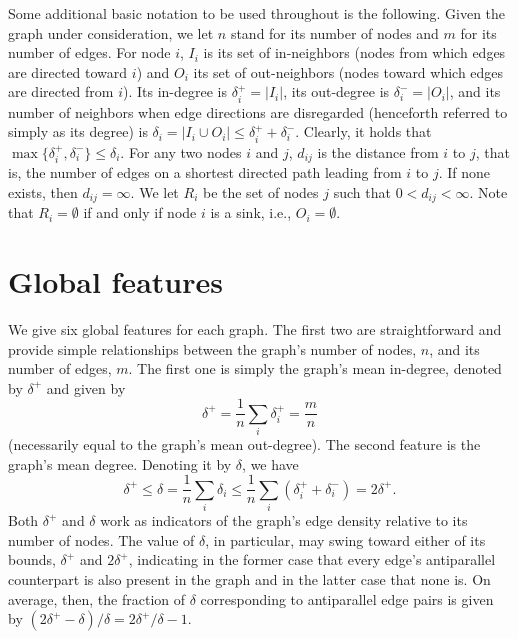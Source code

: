 \documentclass{article}
\begin{document}
Some additional basic notation to be used throughout is the following. Given the
graph under consideration, we let $n$ stand for its number of nodes and $m$ for
its number of edges. For node $i$, $I_i$ is its set of in-neighbors (nodes from
which edges are directed toward $i$) and $O_i$ its set of out-neighbors (nodes
toward which edges are directed from $i$). Its in-degree is
$\delta_i^+=\vert I_i\vert$, its out-degree is $\delta_i^-=\vert O_i\vert$, and
its number of neighbors when edge directions are disregarded (henceforth
referred to simply as its degree) is
$\delta_i=\vert I_i\cup O_i\vert\le\delta_i^++\delta_i^-$. Clearly, it holds
that $\max\{\delta_i^+,\delta_i^-\}\le\delta_i$. For any two nodes $i$ and $j$,
$d_{ij}$ is the distance from $i$ to $j$, that is, the number of edges on a
shortest directed path leading from $i$ to $j$. If none exists, then
$d_{ij}=\infty$. We let $R_i$ be the set of nodes $j$ such that
$0<d_{ij}<\infty$. Note that $R_i=\emptyset$ if and only if node $i$ is a sink,
i.e., $O_i=\emptyset$.

\section{Global features}\label{global}

We give six global features for each graph. The first two are straightforward
and provide simple relationships between the graph's number of nodes, $n$, and
its number of edges, $m$. The first one is simply the graph's mean in-degree,
denoted by $\delta^+$ and given by
\begin{equation}
\delta^+
=\frac{1}{n}\sum_i\delta_i^+
=\frac{m}{n}
\end{equation}
(necessarily equal to the graph's mean out-degree). The second feature is the
graph's mean degree. Denoting it by $\delta$, we have
\begin{equation}
\delta^+
\le\delta
=\frac{1}{n}\sum_i\delta_i
\le\frac{1}{n}\sum_i(\delta_i^++\delta_i^-)
=2\delta^+.
\end{equation}
Both $\delta^+$ and $\delta$ work as indicators of the graph's edge density
relative to its number of nodes. The value of $\delta$, in particular, may swing
toward either of its bounds, $\delta^+$ and $2\delta^+$, indicating in the
former case that every edge's antiparallel counterpart is also present in the
graph and in the latter case that none is. On average, then, the fraction of
$\delta$ corresponding to antiparallel edge pairs is given by
$(2\delta^+-\delta)/\delta=2\delta^+/\delta-1$.
\end{document}
